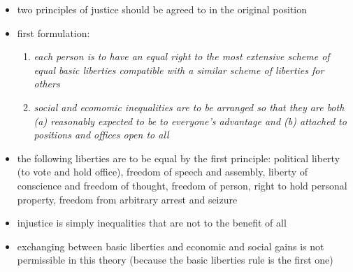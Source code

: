 \begin{itemize}
	\item two principles of justice should be agreed to in the original
	position
	\item first formulation:
	\begin{enumerate}
		\item \textit{each person is to have an equal right to the
		most extensive scheme of equal basic liberties compatible with
		a similar scheme of liberties for others}
		\item \textit{social and ecomomic inequalities are to be
		arranged so that they are both (a) reasonably expected to be
		to everyone's advantage and (b) attached to positions and
		offices open to all}
	\end{enumerate}
	\item the following liberties are to be equal by the first principle:
	political liberty (to vote and hold office), freedom of speech and
	assembly, liberty of conscience and freedom of thought, freedom of
	person, right to hold personal property, freedom from arbitrary arrest
	and seizure
	\item injustice is simply inequalities that are not to the benefit of
	all
	\item exchanging between basic liberties and economic and social gains
	is not permissible in this theory (because the basic liberties rule
	is the first one)
\end{itemize}
